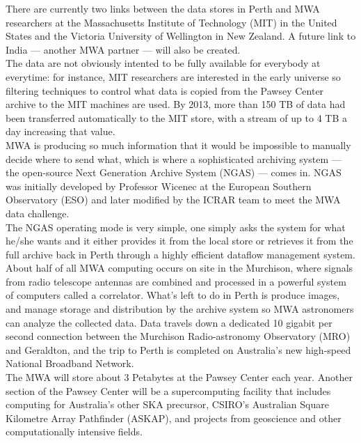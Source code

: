 There are currently two links between the data stores in Perth and MWA researchers at the Massachusetts Institute of Technology (MIT) in the United States and the Victoria University of Wellington in New Zealand. A future link to India — another MWA partner — will also be created.\\

The data are not obviously intented to be fully available for everybody at everytime: for instance, MIT researchers are interested in the early universe so filtering techniques to control what data is copied from the Pawsey Center archive to the MIT machines are used. By 2013, more than 150 TB of data had been transferred automatically to the MIT store, with a stream of up to 4 TB a day increasing that value.\\

MWA is producing so much information that it would be impossible to manually decide where to send what, which is where a sophisticated archiving system — the open-source Next Generation Archive System (NGAS) — comes in. NGAS was initially developed by Professor Wicenec at the European Southern Observatory (ESO) and later modified by the ICRAR team to meet the MWA data challenge.\\

The NGAS operating mode is very simple, one simply asks the system for what he/she wants and it either provides it from the local store or retrieves it from the full archive back in Perth through a highly efficient dataflow management system.\\

About half of all MWA computing occurs on site in the Murchison, where signals from radio telescope antennas are combined and processed in a powerful system of computers called a correlator. What’s left to do in Perth is produce images, and manage storage and distribution by the archive system so MWA astronomers can analyze the collected data. Data travels down a dedicated 10 gigabit per second connection between the Murchison Radio-astronomy Observatory (MRO) and Geraldton, and the trip to Perth is completed on Australia’s new high-speed National Broadband Network.\\

The MWA will store about 3 Petabytes at the Pawsey Center each year. Another section of the Pawsey Center will be a supercomputing facility that includes computing for Australia’s other SKA precursor, CSIRO’s Australian Square Kilometre Array Pathfinder (ASKAP), and projects from geoscience and other computationally intensive fields.\\

